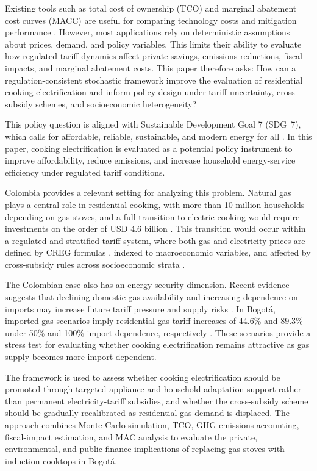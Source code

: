 \documentclass[authoryear,preprint,review,10pt]{elsarticle}
\begin{document}
Existing tools such as total cost of ownership (TCO) and marginal abatement cost curves (MACC) are useful for comparing technology costs and mitigation performance \citep{cabrales2023costos,cimini2022,floess2023}. However, most applications rely on deterministic assumptions about prices, demand, and policy variables. This limits their ability to evaluate how regulated tariff dynamics affect private savings, emissions reductions, fiscal impacts, and marginal abatement costs. This paper therefore asks: How can a regulation-consistent stochastic framework improve the evaluation of residential cooking electrification and inform policy design under tariff uncertainty, cross-subsidy schemes, and socioeconomic heterogeneity?

This policy question is aligned with Sustainable Development Goal 7 (SDG~7), which calls for affordable, reliable, sustainable, and modern energy for all \citep{un_sdg7}. In this paper, cooking electrification is evaluated as a potential policy instrument to improve affordability, reduce emissions, and increase household energy-service efficiency under regulated tariff conditions.

Colombia provides a relevant setting for analyzing this problem. Natural gas plays a central role in residential cooking, with more than 10 million households depending on gas stoves, and a full transition to electric cooking would require investments on the order of USD 4.6 billion \citep{cabrales2025precio_gas}. This transition would occur within a regulated and stratified tariff system, where both gas and electricity prices are defined by CREG formulas \citep{CREG119_2007,CREG137_2013,CREG183_2013,CREG184_2014}, indexed to macroeconomic variables, and affected by cross-subsidy rules across socioeconomic strata \citep{cabrales2023costos}.

The Colombian case also has an energy-security dimension. Recent evidence suggests that declining domestic gas availability and increasing dependence on imports may increase future tariff pressure and supply risks \citep{ramirez2025macro_gas,cabrales2025politica_gas}. In Bogotá, imported-gas scenarios imply residential gas-tariff increases of 44.6\% and 89.3\% under 50\% and 100\% import dependence, respectively \citep{cabrales2025fedesarrollo_gas_imports}. These scenarios provide a stress test for evaluating whether cooking electrification remains attractive as gas supply becomes more import dependent.

The framework is used to assess whether cooking electrification should be promoted through targeted appliance and household adaptation support rather than permanent electricity-tariff subsidies, and whether the cross-subsidy scheme should be gradually recalibrated as residential gas demand is displaced. The approach combines Monte Carlo simulation, TCO, GHG emissions accounting, fiscal-impact estimation, and MAC analysis to evaluate the private, environmental, and public-finance implications of replacing gas stoves with induction cooktops in Bogotá.
\end{document}
